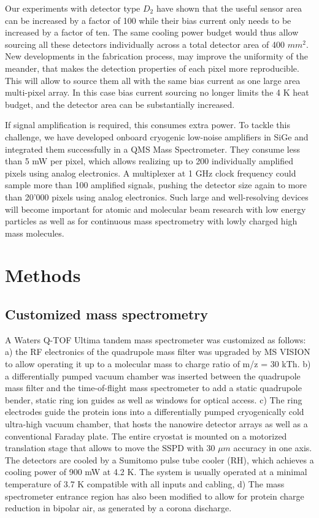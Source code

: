 \documentclass[12pt]{article}
\begin{document}
Our experiments with detector type $D_2$ have shown that the useful sensor area can be increased by a factor of 100 while their bias current only needs to be increased by a factor of ten. The same cooling power budget would thus allow sourcing all these detectors individually across a total detector area of 400 $mm^2$. New developments in the fabrication process, may improve the uniformity of the meander, that makes the detection properties of each pixel more reproducible. This will allow to source them all with the same bias current as one large area multi-pixel array. In this case bias current sourcing no longer limits the 4 K heat budget, and the detector area can be substantially increased.

If signal amplification is required, this consumes extra power. To tackle this challenge, we have developed onboard cryogenic low-noise amplifiers in SiGe and integrated them successfully in a QMS Mass Spectrometer. They consume less than 5 mW per pixel, which allows realizing up to 200 individually amplified pixels using analog electronics. A multiplexer at 1 GHz clock frequency could sample more than 100 amplified signals, pushing the detector size again to more than 20’000 pixels using analog electronics. Such large and well-resolving devices will become important for atomic and molecular beam research with low energy particles as well as for continuous mass spectrometry with lowly charged high mass molecules.

\section*{Methods}

\subsection*{Customized mass spectrometry}
A Waters Q-TOF Ultima tandem mass spectrometer was customized as follows: a) the RF electronics of the quadrupole mass filter was upgraded by MS VISION to allow operating it up to a molecular mass to charge ratio of m/z = 30 kTh. b) a differentially pumped vacuum chamber was inserted between the quadrupole mass filter and the time-of-flight mass spectrometer to add a static quadrupole bender, static ring ion guides as well as windows for optical access. c) The ring electrodes guide the protein ions into a differentially pumped cryogenically cold ultra-high vacuum chamber, that hosts the nanowire detector arrays as well as a conventional Faraday plate. The entire cryostat is mounted on a motorized translation stage that allows to move the SSPD with 30 $\mu m$ accuracy in one axis. The detectors are cooled by a Sumitomo pulse tube cooler (RH), which achieves a cooling power of 900 mW at 4.2 K. The system is usually operated at a minimal temperature of 3.7 K compatible with all inputs and cabling, d) The mass spectrometer entrance region has also been modified to allow for protein charge reduction in bipolar air, as generated by a corona discharge.
\end{document}
